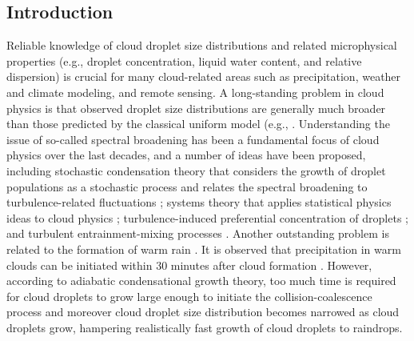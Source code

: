 \documentclass[draft,jgrga]{AGUTeX}
\begin{document}
\begin{article}

\section{Introduction}
Reliable knowledge of cloud droplet size distributions and related microphysical properties (e.g., droplet concentration, liquid water content, and relative dispersion) is crucial for many cloud-related areas such as precipitation, weather and climate modeling, and remote sensing. A long-standing problem in cloud physics is that observed droplet size distributions are generally much broader than those predicted by the classical uniform model (e.g., \cite{Howell1949, HudsonYum1997, YumHudson2005}. Understanding the issue of so-called spectral broadening has been a fundamental focus of cloud physics over the last decades, and a number of ideas have been proposed, including stochastic condensation theory that considers the growth of droplet populations as a stochastic process and relates the spectral broadening to turbulence-related fluctuations \cite{Zhou1964, Sedunov1974, MacGrawLiu2006, KhvorostyanovCurry1999}; systems theory that applies statistical physics ideas to cloud physics \cite{Liu1995, LiuHallett1997, LiuHallett1998, Liu2002, Yano2016}; turbulence-induced preferential concentration of droplets \cite{Shaw1998}; and turbulent entrainment-mixing processes \cite{Warner1973, Baker1980, Hicks1990, TelfordChai1980, Su1998, Lu2013}. Another outstanding problem is related to the formation of warm rain \cite{McGrawLiu2003,MacGrawLiu2004}. It is observed that precipitation in warm clouds can be initiated within $30$ minutes after cloud formation \cite{RogersYau1996}. However, according to adiabatic condensational growth theory, too much time is required for cloud droplets to grow large enough to initiate the collision-coalescence process and moreover cloud droplet size distribution becomes narrowed as cloud droplets grow, hampering realistically fast growth of cloud droplets to raindrops. 


\end{article}
\end{document}
